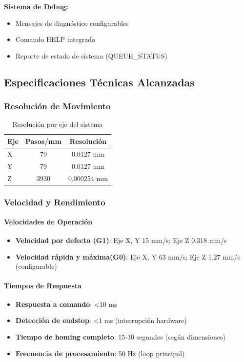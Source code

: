 \documentclass[12pt]{article}
\begin{document}
\textbf{Sistema de Debug:}
\begin{itemize}
    \item Mensajes de diagnóstico configurables
    \item Comando HELP integrado
    \item Reporte de estado de sistema (QUEUE\_STATUS)
\end{itemize}

\subsection{Especificaciones Técnicas Alcanzadas}

\subsubsection{Resolución de Movimiento}

\begin{table}[h]
\centering
\begin{tabular}{|l|c|c|}
\hline
\textbf{Eje} & \textbf{Pasos/mm} & \textbf{Resolución} \\
\hline
X & 79 & 0.0127 mm \\
Y & 79 & 0.0127 mm \\
Z & 3930 & 0.000254 mm \\
\hline
\end{tabular}
\caption{Resolución por eje del sistema}
\end{table}

\subsubsection{Velocidad y Rendimiento}

\paragraph{Velocidades de Operación}
\begin{itemize}
    \item \textbf{Velocidad por defecto (G1)}: Eje X, Y 15 mm/s; Eje Z 0.318 mm/s
    \item \textbf{Velocidad rápida y máxima(G0)}: Eje X, Y 63 mm/s; Eje Z 1.27 mm/s (configurable)
\end{itemize}

\paragraph{Tiempos de Respuesta}
\begin{itemize}
    \item \textbf{Respuesta a comando}: <10 ms
    \item \textbf{Detección de endstop}: <1 ms (interrupción hardware)
    \item \textbf{Tiempo de homing completo}: 15-30 segundos (según dimensiones)
    \item \textbf{Frecuencia de procesamiento}: 50 Hz (loop principal)
\end{itemize}
\end{document}
